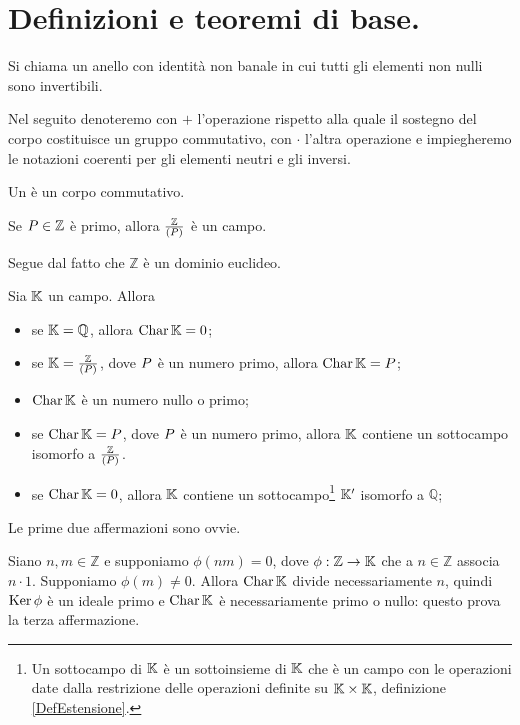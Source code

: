 \section{Definizioni e teoremi di base.}\label{DefinizioniETeoremiDiBase}
\begin{Definition}
	Si chiama  un anello con identit\`a non banale in cui tutti gli elementi non nulli sono invertibili.
\end{Definition}
\par Nel seguito denoteremo con $+$ l'operazione rispetto alla quale il sostegno del corpo costituisce un gruppo commutativo, con $\cdot$ l'altra operazione e impiegheremo le notazioni coerenti per gli elementi neutri e gli inversi.
\begin{Definition}
	Un  \`e un corpo commutativo.
\end{Definition}
\begin{Theorem}
	Se $P \in \mathbb{Z}$ \`e primo, allora $\frac{\mathbb{Z}}{(P)}$ \`e un campo.
\end{Theorem}
\Proof Segue dal fatto che $\mathbb{Z}$ \`e un dominio euclideo. \EndProof
\begin{Theorem}
	Sia $\mathbb{K}$ un campo. Allora
	\begin{itemize}
		\item se $\mathbb{K} = \mathbb{Q}$, allora $\operatorname{Char}{\mathbb{K}} = 0$;
		\item se $\mathbb{K} = \frac{\mathbb{Z}}{(P)}$, dove $P$ \`e un numero primo, allora $\operatorname{Char}{\mathbb{K}} = P$;
		\item $\operatorname{Char}{\mathbb{K}}$ \`e un numero nullo o primo;
		\item se $\operatorname{Char}{\mathbb{K}} = P$, dove $P$ \`e un numero primo, allora $\mathbb{K}$ contiene un sottocampo isomorfo a $\frac{\mathbb{Z}}{(P)}$.
		\item se $\operatorname{Char}{\mathbb{K}} = 0$, allora $\mathbb{K}$ contiene un sottocampo\footnote{Un sottocampo di $\mathbb{K}$ \`e un sottoinsieme di $\mathbb{K}$ che \`e un campo con le operazioni date dalla restrizione delle operazioni definite su $\mathbb{K} \times \mathbb{K}$, \Cfr definizione \ref{DefEstensione}.} $\mathbb{K}'$ isomorfo a $\mathbb{Q}$;
	\end{itemize}
\end{Theorem}
\Proof Le prime due affermazioni sono ovvie.
\par Siano $n, m \in \mathbb{Z}$ e supponiamo $\phi(nm) = 0$, dove $\phi: \mathbb{Z} \rightarrow \mathbb{K}$ che a $n \in \mathbb{Z}$ associa $n \cdot 1$. Supponiamo $\phi(m) \neq 0$. Allora $\operatorname{Char}{\mathbb{K}}$ divide necessariamente $n$, quindi $\operatorname{Ker}{\phi}$ \`e un ideale primo e $\operatorname{Char}{\mathbb{K}}$ \`e necessariamente primo o nullo: questo prova la terza affermazione.
